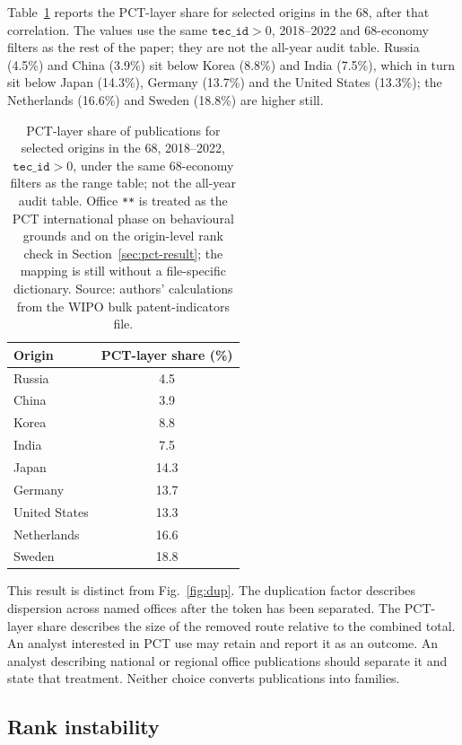 \documentclass[a4paper,fleqn]{cas-dc}
\begin{document}
Table~\ref{tab:pct} reports the PCT-layer share for selected origins in the
68, after that correlation. The values use the same $\texttt{tec\_id}>0$,
2018--2022 and 68-economy filters as the rest of the paper; they are not the
all-year audit table. Russia (4.5\%) and China (3.9\%) sit below Korea
(8.8\%) and India (7.5\%), which in turn sit below Japan (14.3\%), Germany
(13.7\%) and the United States (13.3\%); the Netherlands (16.6\%) and
Sweden (18.8\%) are higher still.

\begin{table}[t]
\caption{PCT-layer share of publications for selected origins in the 68,
2018--2022, $\texttt{tec\_id}>0$, under the same 68-economy filters as the
range table; not the all-year audit table. Office \texttt{**} is treated as
the PCT international phase on behavioural grounds and on the origin-level
rank check in Section~\ref{sec:pct-result}; the mapping is still without a
file-specific dictionary. Source: authors' calculations from the WIPO bulk
patent-indicators file.}
\label{tab:pct}
\centering
\small
\begin{tabular}{@{}lc@{}}
\toprule
Origin & PCT-layer share (\%) \\
\midrule
Russia & 4.5 \\
China & 3.9 \\
Korea & 8.8 \\
India & 7.5 \\
Japan & 14.3 \\
Germany & 13.7 \\
United States & 13.3 \\
Netherlands & 16.6 \\
Sweden & 18.8 \\
\bottomrule
\end{tabular}
\end{table}

This result is distinct from Fig.~\ref{fig:dup}. The duplication factor
describes dispersion across named offices after the token has been separated.
The PCT-layer share describes the size of the removed route relative to the
combined total. An analyst interested in PCT use may retain and report it as
an outcome. An analyst describing national or regional office publications
should separate it and state that treatment. Neither choice converts
publications into families.

\subsection{Rank instability}\label{sec:ranks}
\end{document}

